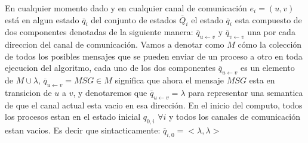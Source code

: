 \documentclass[10pt]{report}
\begin{document}
    En cualquier momento dado y en cualquier canal de comunicación $e_{i}=(u,v)$ está en algun estado
    $\overline{q}_{i}$ del conjunto de estados $\overline{Q}_{i}$
    el estado $\overline{q}_{i}$ esta compuesto de dos componentes denotadas de la siguiente manera:
    $\overline{q}_{u\leftarrow v}$ y $\overline{q}_{v\leftarrow v}$ una por cada direccion del canal
    de comunicación.
    Vamos a denotar como $M$ cómo la colección  de todos los posibles mensajes que se pueden enviar de un proceso a otro en toda ejecucion del algoritmo,
    \space cada uno de los dos componentes $\overline{q}_{u \leftarrow v}$ es un elemento de $M \cup \lambda$,
    $\overline{q}_{u\leftarrow v} = MSG\in M$ significa que ahora el mensaje $MSG$ esta en transicion de
    $u$ a $v$, y denotaremos que $\overline{q}_{u\leftarrow v} = \lambda$ para representar una semantica de que
    el canal actual esta vacio en esa dirección.
    En el inicio del computo, todos los procesos estan en el estado inicial $q_{0,i}$ $\forall i$
    y todos los canales de comunicación estan vacios.
    Es decir que sintacticamente: $\overline{q}_{i,0} = <\lambda,\lambda>$
\end{document}
